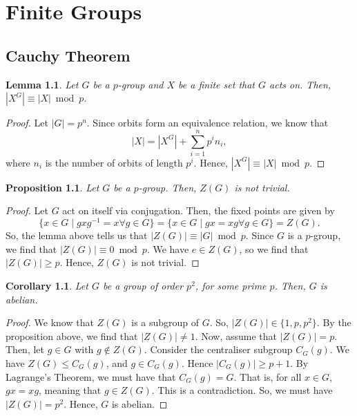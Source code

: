 \documentclass[a4paper, openany]{memoir}
\theoremstyle{definition}
\theoremstyle{plain}
\newtheorem{lemma}[definition]{Lemma}
\newtheorem{proposition}[definition]{Proposition}
\newtheorem{corollary}[definition]{Corollary}
\begin{document}
    \chapter{Finite Groups}
    \section{Cauchy Theorem}

    \begin{lemma}
        Let $G$ be a $p$-group and $X$ be a finite set that $G$ acts on. Then, $|X^G| \equiv |X| \bmod{p}$.
    \end{lemma}
    \begin{proof}
        Let $|G| = p^n$. Since orbits form an equivalence relation, we know that
        \[|X| = |X^G| + \sum_{i=1}^n p^i n_i,\]
        where $n_i$ is the number of orbits of length $p^i$. Hence, $|X^G| \equiv |X| \bmod{p}$.
    \end{proof}

    \begin{proposition}
        Let $G$ be a $p$-group. Then, $Z(G)$ is not trivial.
    \end{proposition}
    \begin{proof}
        Let $G$ act on itself via conjugation. Then, the fixed points are given by
        \[\{x \in G \mid gxg^{-1} = x \forall g \in G\} = \{x \in G \mid gx = xg \forall g \in G\} = Z(G).\]
        So, the lemma above tells us that $|Z(G)| \equiv |G| \bmod{p}$. Since $G$ is a $p$-group, we find that $|Z(G)| \equiv 0 \bmod{p}$. We have $e \in Z(G)$, so we find that $|Z(G)| \geq p$. Hence, $Z(G)$ is not trivial.
    \end{proof}

    \begin{corollary}
        Let $G$ be a group of order $p^2$, for some prime $p$. Then, $G$ is abelian.
    \end{corollary}
    \begin{proof}
        We know that $Z(G)$ is a subgroup of $G$. So, $|Z(G)| \in \{1, p, p^2\}$. By the proposition above, we find that $|Z(G)| \neq 1$. Now, assume that $|Z(G)| = p$. Then, let $g \in G$ with $g \not\in Z(G)$. Consider the centraliser subgroup $C_G(g)$. We have $Z(G) \leq C_G(g)$, and $g \in C_G(g)$. Hence $|C_G(g)| \geq p + 1$. By Lagrange's Theorem, we must have that $C_G(g) = G$. That is, for all $x \in G$, $gx = xg$, meaning that $g \in Z(G)$. This is a contradiction. So, we must have $|Z(G)| = p^2$. Hence, $G$ is abelian.
    \end{proof}
\end{document}
